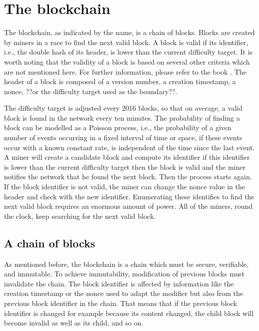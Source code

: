 \section{The blockchain}

The blockchain, as indicated by the name, is a chain of blocks. Blocks are
created by miners in a race to find the next valid block. A block is valid if its identifier, i.e., the double hash of its
header, is lower than the current difficulty target. It is worth noting that the
validity of a block is based on several other criteria which are not mentioned
here.  For further information, please refer to the book .
The header of a block is composed of a version number, a creation timestamp, a
nonce, ??or the difficulty target used as the boundary??.

The difficulty target is adjusted every 2016 blocks, so that on average, a valid block is found in the network every ten minutes. The probability of finding a block can be modelled as a Poisson process,
i.e., the probability of a given number of events occurring in a fixed interval
of time or space, if these events occur with a known constant rate, is independent
of the time since the last event. A miner will create a candidate block and
compute its identifier if this identifier is lower than the current difficulty
target then the block is valid and the miner notifies the network that he found
the next block. Then the process starts again. If the block identifier is not
valid, the miner can change the nonce value in the header and check with the new
identifier. Enumerating these identifies to find the next valid block requires an
enormous amount of power. All of the miners, round the clock, keep searching for
the next valid block.

\subsection{A chain of blocks}

As mentioned before, the blockchain is a chain which must be secure, verifiable,
and immutable. To achieve immutability, modification of previous blocks must
invalidate the chain. The block identifier is affected by information like the
creation timestamp or the nonce used to adapt the modifier but also from the
previous block identifier in the chain. That means that if the previous block
identifier is changed for example because its content changed, the child block
will become invalid as well as its child, and so on.

